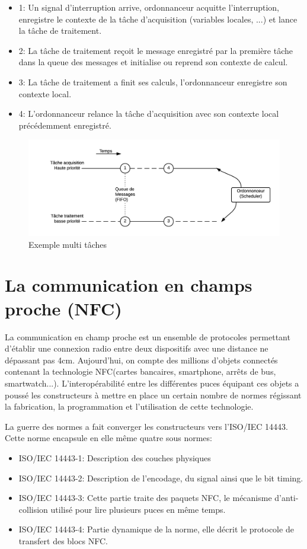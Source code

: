 \documentclass{themeensg}
\begin{document}
\begin{itemize}
\item 1: Un signal d'interruption arrive, ordonnanceur acquitte l'interruption, enregistre le contexte de la tâche d'acquisition (variables locales, ...) et lance la tâche de traitement.
\item 2: La tâche de traitement reçoit le message enregistré par la première tâche dans la queue des messages et initialise ou reprend son contexte de calcul.
\item 3: La tâche de traitement a finit ses calculs, l’ordonnanceur enregistre son contexte local.
\item 4: L'ordonnanceur relance la tâche d'acquisition avec son contexte local précédemment enregistré.

\end{itemize}
\begin{figure}[h!]
\centering
\includegraphics[scale=1]{images/fig2.png}
\caption{Exemple multi tâches}
\label{fig:multitask_ex}
\end{figure}

\section{La communication en champs proche (NFC)}
La communication en champ proche est un ensemble de protocoles permettant d'établir une connexion radio entre deux dispositifs avec une distance ne dépassant pas 4cm. Aujourd'hui, on compte des millions d'objets connectés contenant la technologie NFC(cartes bancaires, smartphone, arrêts de bus, smartwatch...). L'interopérabilité entre les différentes puces équipant ces objets a poussé les constructeurs à mettre en place un certain nombre de normes régissant la fabrication, la programmation et l'utilisation de cette technologie.

La guerre des normes a fait converger les constructeurs vers l'ISO/IEC 14443. Cette norme encapsule en elle même quatre sous normes:

\begin{itemize}
\item ISO/IEC 14443-1: Description des couches physiques
\item ISO/IEC 14443-2: Description de l'encodage, du signal ainsi que le bit timing. 
\item ISO/IEC 14443-3: Cette partie traite des paquets NFC, le mécanisme d’anti-collision utilisé pour lire plusieurs puces en même temps.
\item ISO/IEC 14443-4: Partie dynamique de la norme, elle décrit le protocole de transfert des blocs NFC.
\end{itemize}
\end{document}
